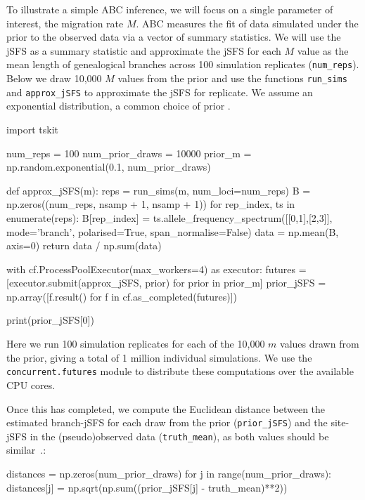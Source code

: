 \documentclass[graybox]{svmult}
\begin{document}
    To illustrate a simple ABC inference, we will focus on a single
parameter of interest, the migration rate \(M\).
ABC measures the fit of data simulated under the prior to the observed
data via a vector of summary statistics. We will use the jSFS as a
summary statistic and approximate the jSFS for each \(M\) value as the
mean length of genealogical branches across 100 simulation replicates (\texttt{num\_reps}). Below we
draw 10,000 \(M\) values from the prior and use the functions
\texttt{run\_sims} and \texttt{approx\_jSFS} to approximate the jSFS for
 replicate. We assume an exponential distribution, a common choice of prior \citep{hey2004multilocus}.

\begin{pythoncode}
import tskit

num_reps = 100
num_prior_draws = 10000
prior_m = np.random.exponential(0.1, num_prior_draws)

def approx_jSFS(m):
    reps = run_sims(m, num_loci=num_reps)
    B = np.zeros((num_reps, nsamp + 1, nsamp + 1))
    for rep_index, ts in enumerate(reps):
        B[rep_index] = ts.allele_frequency_spectrum([[0,1],[2,3]], mode='branch', polarised=True, span_normalise=False)
    data = np.mean(B, axis=0)
    return data / np.sum(data)

with cf.ProcessPoolExecutor(max_workers=4) as executor:
    futures = [executor.submit(approx_jSFS, prior) for prior in prior_m]
    prior_jSFS = np.array([f.result() for f in cf.as_completed(futures)])

print(prior_jSFS[0])
\end{pythoncode}

Here we run 100 simulation replicates for each of the 10,000
$m$ values drawn from the prior, giving a total of 1 million individual simulations.
We use the \texttt{concurrent.futures} module to distribute these
computations over the available CPU cores.

Once this has completed, we compute the Euclidean distance between the estimated branch-jSFS for each
draw from the prior (\texttt{prior\_jSFS}) and the site-jSFS in the (pseudo)observed
data (\texttt{truth\_mean}), as both values should be similar~\citep{ralph_efficiently_2020}.:
\begin{pythoncode}
distances = np.zeros(num_prior_draws)
for j in range(num_prior_draws):
    distances[j] = np.sqrt(np.sum((prior_jSFS[j] - truth_mean)**2))
\end{pythoncode}
\end{document}
